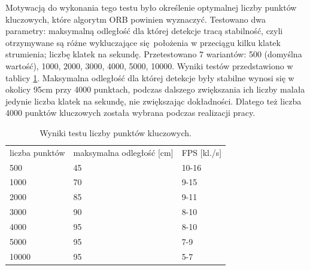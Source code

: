 \documentclass[12pt,twoside,polish]{article}
\begin{document}
Motywacją do wykonania tego testu było określenie optymalnej liczby punktów kluczowych, które algorytm ORB powinien wyznaczyć. Testowano dwa parametry: maksymalną odległość dla której detekcje tracą stabilność, czyli otrzymywane są różne wykluczające się położenia w przeciągu kilku klatek strumienia; liczbę klatek na sekundę. Przetestowano 7 wariantów: 500 (domyślna wartość), 1000, 2000, 3000, 4000, 5000, 10000. Wyniki testów przedstawiono w tablicy \ref{table:test_kp}. Maksymalna odległość dla której detekcje były stabilne wynosi się w okolicy 95cm przy 4000 punktach, podczas dalszego zwiększania ich liczby malała jedynie liczba klatek na sekundę, nie zwiększając dokładności. Dlatego też liczba 4000 punktów kluczowych została wybrana podczas realizacji pracy.

\begin{table}[]
	\centering
	\caption{Wyniki testu liczby punktów kluczowych.}
	\label{table:test_kp}
	\begin{tabular}{lll}
	\rowcolor[HTML]{EFEFEF} 
	liczba punktów & maksymalna odległość {[}cm{]} & FPS {[}kl./s{]} \\
	500            & 45                            & 10-16           \\
	1000           & 70                            & 9-15            \\
	2000           & 85                            & 9-11            \\
	3000           & 90                            & 8-10            \\
	4000           & 95                            & 8-10            \\
	5000           & 95                            & 7-9             \\
	10000          & 95                            & 5-7            
	\end{tabular}
	\end{table}
\end{document}
